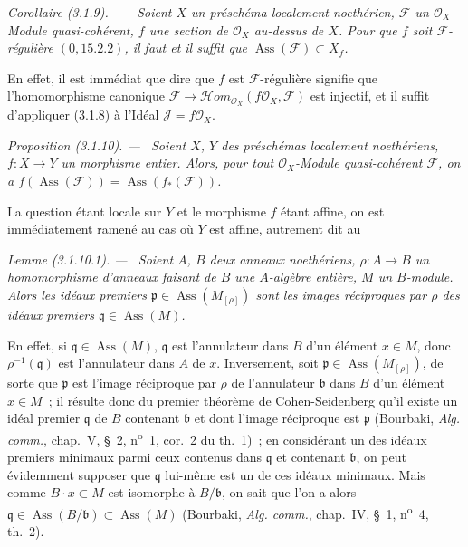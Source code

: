 \documentclass[10pt,oneside]{book}
\newcommand{\oldpage}[2][]{%
  \setcounter{footnote}{0}%
  \marginpar{\scriptsize\textbf{#1}~|~#2}\ignorespaces}
\newenvironment{proposition}[1][]{%
  \par\medskip\noindent\itshape Proposition (#1). ---\ }{\par}
\newenvironment{corollary}[1][]{%
  \par\medskip\noindent\itshape Corollaire (#1). ---\ }{\par}
\newenvironment{lemma}[1][]{%
  \par\medskip\noindent\itshape Lemme (#1). ---\ }{\par}
\begin{document}
\begin{corollary}[3.1.9]
\label{IV.2.3.1.9-fr}
Soient $X$ un préschéma localement noethérien, $\mathcal F$ un
$\mathcal O_X$-Module quasi-cohérent, $f$ une section de $\mathcal O_X$
au-dessus de $X$. Pour que $f$ soit $\mathcal F$-régulière
$(0,15.2.2)$, il faut et il suffit que
$\operatorname{Ass}(\mathcal F)\subset X_f$.
\end{corollary}

En effet, il est immédiat que dire que $f$ est $\mathcal F$-régulière signifie
que l'homomorphisme canonique
$\mathcal F\to\mathcal Hom_{\mathcal O_X}(f\mathcal O_X,\mathcal F)$ est
injectif, et il suffit d'appliquer (3.1.8) à l'Idéal
$\mathcal J=f\mathcal O_X$.

\oldpage[IV-2]{39}
\begin{proposition}[3.1.10]
\label{IV.2.3.1.10-fr}
Soient $X$, $Y$ des préschémas localement noethériens, $f:X\to Y$ un
morphisme entier. Alors, pour tout $\mathcal O_X$-Module quasi-cohérent
$\mathcal F$, on a
$f(\operatorname{Ass}(\mathcal F))=\operatorname{Ass}(f_*(\mathcal F))$.
\end{proposition}

La question étant locale sur $Y$ et le morphisme $f$ étant affine, on est
immédiatement ramené au cas où $Y$ est affine, autrement dit au

\begin{lemma}[3.1.10.1]
\label{IV.2.3.1.10.1-fr}
Soient $A$, $B$ deux anneaux noethériens, $\rho:A\to B$ un homomorphisme
d'anneaux faisant de $B$ une $A$-algèbre entière, $M$ un $B$-module. Alors les
idéaux premiers $\mathfrak p\in\operatorname{Ass}(M_{[\rho]})$ sont les images
réciproques par $\rho$ des idéaux premiers
$\mathfrak q\in\operatorname{Ass}(M)$.
\end{lemma}

En effet, si $\mathfrak q\in\operatorname{Ass}(M)$, $\mathfrak q$ est
l'annulateur dans $B$ d'un élément $x\in M$, donc
$\rho^{-1}(\mathfrak q)$ est l'annulateur dans $A$ de $x$. Inversement, soit
$\mathfrak p\in\operatorname{Ass}(M_{[\rho]})$, de sorte que $\mathfrak p$
est l'image réciproque par $\rho$ de l'annulateur $\mathfrak b$ dans $B$ d'un
élément $x\in M$~; il résulte donc du premier théorème de Cohen-Seidenberg
qu'il existe un idéal premier $\mathfrak q$ de $B$ contenant $\mathfrak b$ et
dont l'image réciproque est $\mathfrak p$ (Bourbaki, \emph{Alg. comm.},
chap.~V, \S~2, n\textsuperscript{o}~1, cor.~2 du th.~1)~; en considérant un
des idéaux premiers minimaux parmi ceux contenus dans $\mathfrak q$ et
contenant $\mathfrak b$, on peut évidemment supposer que $\mathfrak q$
lui-même est un de ces idéaux minimaux. Mais comme $B\cdot x\subset M$ est
isomorphe à $B/\mathfrak b$, on sait que l'on a alors
$\mathfrak q\in\operatorname{Ass}(B/\mathfrak b)\subset\operatorname{Ass}(M)$
(Bourbaki, \emph{Alg. comm.}, chap.~IV, \S~1, n\textsuperscript{o}~4,
th.~2).
\end{document}
